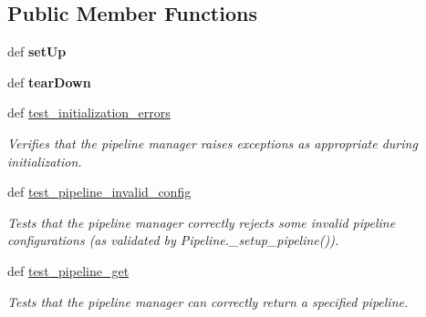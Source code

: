 \subsection*{Public Member Functions}
\begin{DoxyCompactItemize}
\item 
\hypertarget{classhwm_1_1hardware_1_1pipelines_1_1tests_1_1test__pipeline__manager_1_1_test_pipeline_manager_ac179d43830017f0a99bf9712f7cbee81}{def {\bfseries set\-Up}}\label{classhwm_1_1hardware_1_1pipelines_1_1tests_1_1test__pipeline__manager_1_1_test_pipeline_manager_ac179d43830017f0a99bf9712f7cbee81}

\item 
\hypertarget{classhwm_1_1hardware_1_1pipelines_1_1tests_1_1test__pipeline__manager_1_1_test_pipeline_manager_a72737439c025f32b64a8d67987736046}{def {\bfseries tear\-Down}}\label{classhwm_1_1hardware_1_1pipelines_1_1tests_1_1test__pipeline__manager_1_1_test_pipeline_manager_a72737439c025f32b64a8d67987736046}

\item 
\hypertarget{classhwm_1_1hardware_1_1pipelines_1_1tests_1_1test__pipeline__manager_1_1_test_pipeline_manager_a7b4162cdcb61eaf8e7991d13b2432897}{def \hyperlink{classhwm_1_1hardware_1_1pipelines_1_1tests_1_1test__pipeline__manager_1_1_test_pipeline_manager_a7b4162cdcb61eaf8e7991d13b2432897}{test\-\_\-initialization\-\_\-errors}}\label{classhwm_1_1hardware_1_1pipelines_1_1tests_1_1test__pipeline__manager_1_1_test_pipeline_manager_a7b4162cdcb61eaf8e7991d13b2432897}

\begin{DoxyCompactList}\small\item\em Verifies that the pipeline manager raises exceptions as appropriate during initialization. \end{DoxyCompactList}\item 
def \hyperlink{classhwm_1_1hardware_1_1pipelines_1_1tests_1_1test__pipeline__manager_1_1_test_pipeline_manager_a1f51d3e12b2c7028d2bb7eaf8fc30024}{test\-\_\-pipeline\-\_\-invalid\-\_\-config}
\begin{DoxyCompactList}\small\item\em Tests that the pipeline manager correctly rejects some invalid pipeline configurations (as validated by Pipeline.\-\_\-setup\-\_\-pipeline()). \end{DoxyCompactList}\item 
\hypertarget{classhwm_1_1hardware_1_1pipelines_1_1tests_1_1test__pipeline__manager_1_1_test_pipeline_manager_afc95e79fcb438a9a1bbbc1987632db6c}{def \hyperlink{classhwm_1_1hardware_1_1pipelines_1_1tests_1_1test__pipeline__manager_1_1_test_pipeline_manager_afc95e79fcb438a9a1bbbc1987632db6c}{test\-\_\-pipeline\-\_\-get}}\label{classhwm_1_1hardware_1_1pipelines_1_1tests_1_1test__pipeline__manager_1_1_test_pipeline_manager_afc95e79fcb438a9a1bbbc1987632db6c}

\begin{DoxyCompactList}\small\item\em Tests that the pipeline manager can correctly return a specified pipeline. \end{DoxyCompactList}\end{DoxyCompactItemize}
